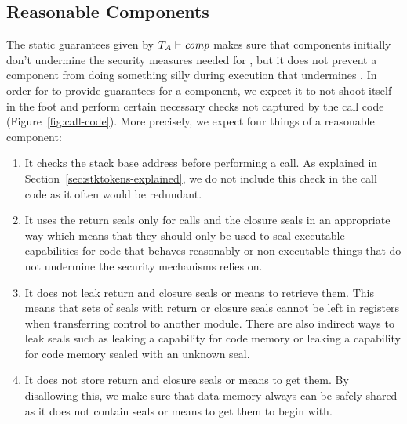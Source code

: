 \documentclass[acmsmall,screen]{acmart}\settopmatter{}
\renewcommand{\comp}{\var{comp}}
\newcommand{\wdjud}[2][ ]{#1 \vdash #2}
\begin{document}
\subsection{Reasonable Components}
The static guarantees given by $\wdjud[\ta]{\comp}$ makes sure that components initially don't undermine the security measures needed for \stktokens{}, but it does not prevent a component from doing something silly during execution that undermines \stktokens{}.
In order for \stktokens{} to provide guarantees for a component, we expect it to not shoot itself in the foot and perform certain necessary checks not captured by the call code (Figure~\ref{fig:call-code}).
More precisely, we expect four things of a reasonable component:
\begin{enumerate}[label=(\arabic*)]
\item It checks the stack base address before performing a call.
As explained in Section~\ref{sec:stktokens-explained}, we do not include this check in the call code as it often would be redundant.
\item It uses the return seals only for calls and the closure seals in an appropriate way which means that they should only be used to seal executable capabilities for code that behaves reasonably or non-executable things that do not undermine the security mechanisms \stktokens{} relies on.
\item It does not leak return and closure seals or means to retrieve them.
This means that sets of seals with return or closure seals cannot be left in registers when transferring control to another module.
There are also indirect ways to leak seals such as leaking a capability for code memory or leaking a capability for code memory sealed with an unknown seal.
\item It does not store return and closure seals or means to get them.
By disallowing this, we make sure that data memory always can be safely shared as it does not contain seals or means to get them to begin with.
\end{enumerate}
\end{document}
